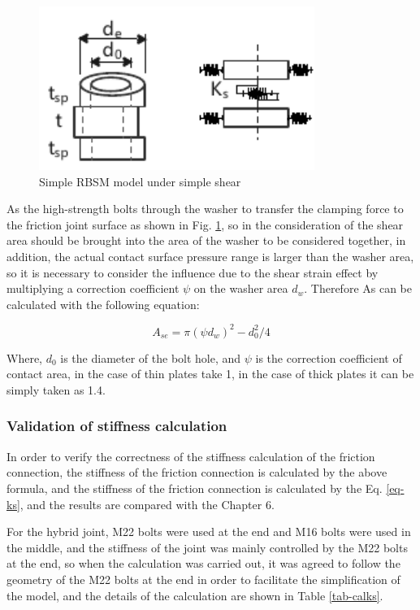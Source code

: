 \begin{figure}[htbp]
    \centering
    \includegraphics[width=0.8\textwidth]{imgs/ch7/simp_rbsm.pdf}
    \caption{Simple RBSM model under simple shear}
    \label{fig-simp_rbsm}
\end{figure}

As the high-strength bolts through the washer to transfer the clamping force to the friction joint surface as shown in Fig. \ref{fig-simp_rbsm}, so in the consideration of the shear area should be brought into the area of the washer to be considered together, in addition, the actual contact surface pressure range is larger than the washer area, so it is necessary to consider the influence due to the shear strain effect by multiplying a correction coefficient $\psi$ on the washer area $d_w$.
Therefore As can be calculated with the following equation:

\begin{equation}
    A_{se} = \pi{(\psi d_w)^2-d_0^2} / 4
\end{equation}

Where, $d_0$ is the diameter of the bolt hole, and $\psi$ is the correction coefficient of contact area, in the case of thin plates take 1, in the case of thick plates it can be simply taken as 1.4.

\subsubsection{Validation of stiffness calculation}

In order to verify the correctness of the stiffness calculation of the friction connection, the stiffness of the friction connection is calculated by the above formula, and the stiffness of the friction connection is calculated by the Eq. \ref{eq-ks}, and the results are compared with the Chapter 6. 

For the hybrid joint, M22 bolts were used at the end and M16 bolts were used in the middle, and the stiffness of the joint was mainly controlled by the M22 bolts at the end, so when the calculation was carried out, it was agreed to follow the geometry of the M22 bolts at the end in order to facilitate the simplification of the model, and the details of the calculation are shown in Table \ref{tab-calks}.

